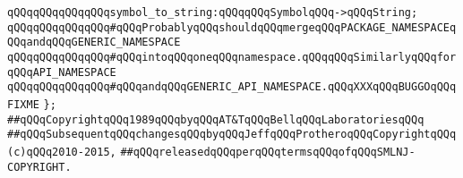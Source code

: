 \verb|qQQqqQQqqQQqqQQqsymbol_to_string:qQQqqQQqSymbolqQQq->qQQqString;|\newline
\newline
\verb|qQQqqQQqqQQqqQQq#qQQqProbablyqQQqshouldqQQqmergeqQQqPACKAGE_NAMESPACEqQQqandqQQqGENERIC_NAMESPACE|\newline
\verb|qQQqqQQqqQQqqQQq#qQQqintoqQQqoneqQQqnamespace.qQQqqQQqSimilarlyqQQqforqQQqAPI_NAMESPACE|\newline
\verb|qQQqqQQqqQQqqQQq#qQQqandqQQqGENERIC_API_NAMESPACE.qQQqXXXqQQqBUGGOqQQqFIXME|\newline
\newline
\verb|};|\newline
\newline
\newline
\verb|##qQQqCopyrightqQQq1989qQQqbyqQQqAT&TqQQqBellqQQqLaboratoriesqQQq|\newline
\verb|##qQQqSubsequentqQQqchangesqQQqbyqQQqJeffqQQqProtheroqQQqCopyrightqQQq(c)qQQq2010-2015,|\newline
\verb|##qQQqreleasedqQQqperqQQqtermsqQQqofqQQqSMLNJ-COPYRIGHT.|\newline

